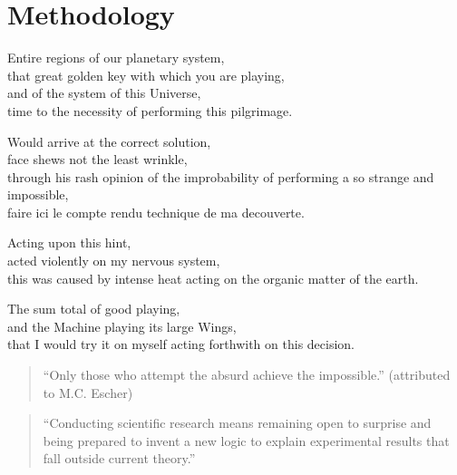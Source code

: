 
\chapter{Methodology}
\label{ch:methodology}

\startcontents[chapters]

Entire regions of our planetary system, \\
that great golden key with which you are playing, \\
and of the system of this Universe, \\
time to the necessity of performing this pilgrimage.

Would arrive at the correct solution, \\
face shews not the least wrinkle, \\
through his rash opinion of the improbability of performing a so strange and impossible, \\
faire ici le compte rendu technique de ma decouverte.

Acting upon this hint, \\
acted violently on my nervous system, \\
this was caused by intense heat acting on the organic matter of the earth.

The sum total of good playing, \\
and the Machine playing its large Wings, \\
that I would try it on myself acting forthwith on this decision.

\vfill
\minicontents
\newpage

\begin{quote}
  ``Only those who attempt the absurd achieve the impossible.'' (attributed to M.C. Escher)
\end{quote}


\begin{quote}
  ``Conducting scientific research means remaining open to surprise and being prepared to invent a new logic to explain experimental results that fall outside current theory.'' \autocite{Jarry2006}
\end{quote}


